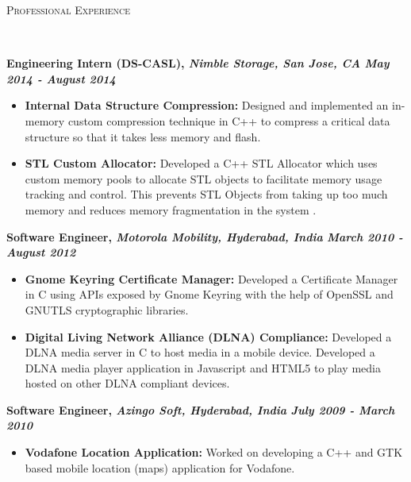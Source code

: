 \documentclass[11pt]{article}
\newenvironment{changemargin}[2]{%
  \begin{list}{}{%
    \setlength{\topsep}{0pt}%
    \setlength{\leftmargin}{#1}%
    \setlength{\rightmargin}{#2}%
    \setlength{\listparindent}{\parindent}%
    \setlength{\itemindent}{\parindent}%
    \setlength{\parsep}{\parskip}%
  }%
  \item[]}{\end{list}
}
\newcommand{\lineover}{
	\begin{changemargin}{-0.05in}{-0.05in}
		\vspace*{-8pt}
		\hrulefill \\
		\vspace*{-2pt}
	\end{changemargin}
}
\newcommand{\header}[1]{
	\begin{changemargin}{-0.5in}{-0.5in}
		\scshape{#1}\\
  	\lineover
	\end{changemargin}
}
\newenvironment{body} {
	\vspace*{-16pt}
	\begin{changemargin}{-0.25in}{-0.5in}
  }	
	{\end{changemargin}
}
\begin{document}
\smallskip	

\header{Professional Experience}

\begin{body}
	\vspace{14pt}
	\textbf {Engineering Intern (DS-CASL), \emph{Nimble Storage, San Jose, CA} \hfill \emph{May 2014 - August 2014}}\\
	\vspace*{-4pt}
	\begin{itemize} \itemsep -0pt
		\item \textbf{Internal Data Structure Compression:} Designed and implemented an in-memory custom compression technique in C++ to compress a critical data structure so that it takes less memory and flash.
		\item \textbf{STL Custom Allocator:} Developed a C++ STL Allocator which uses custom memory pools to allocate STL objects to facilitate memory usage tracking and control. This prevents STL Objects from taking up too much memory and reduces memory fragmentation in the system
		.
	\end{itemize}
	
	\textbf{Software Engineer, \emph{Motorola Mobility, Hyderabad, India} \hfill \emph{March 2010 - August 2012}}\\
	\vspace*{-4pt}
	\begin{itemize} \itemsep -0pt  %
		\item \textbf{Gnome Keyring Certificate Manager:} Developed a Certificate Manager in C using APIs exposed by Gnome Keyring with the help of OpenSSL and GNUTLS cryptographic libraries.
		\item \textbf{Digital Living Network Alliance (DLNA) Compliance:} Developed a DLNA media server in C to host media in a mobile device. Developed a DLNA media player application in Javascript and HTML5 to play media hosted on other DLNA compliant devices.
	\end{itemize}

	\textbf {Software Engineer, \emph{Azingo Soft, Hyderabad, India} \hfill \emph{July 2009 - March 2010}}\\
	\vspace*{-4pt}
	\begin{itemize} \itemsep -0pt
		\item \textbf{Vodafone Location Application:} Worked on developing a C++ and GTK based mobile location (maps) application for Vodafone.
	\end{itemize}
\end{body}
\end{document}
